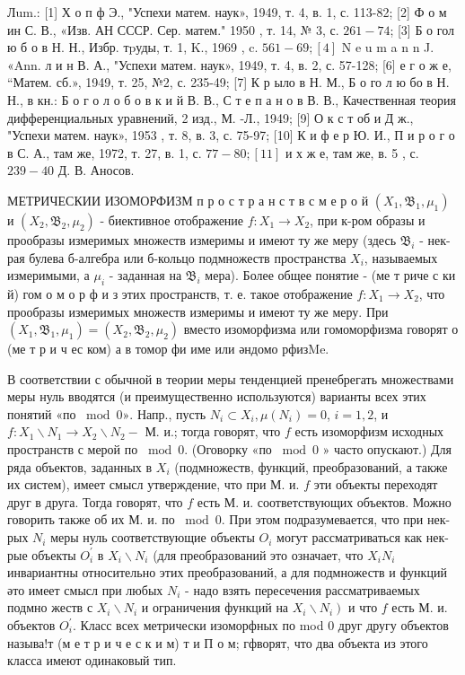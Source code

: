 \documentclass[10pt]{article}
\begin{document}
Лum.: [1] Х о п ф Э., "Успехи матем. наук», 1949, т. 4, в. 1, с. 113-82; [2] Ф о м ин С. В., «Изв. АН СССР. Сер. матем." 1950 , т. 14, № 3, с. $261-74$; [3] Б о гол ю б о в Н. Н., Избр. тpуды, т. 1, K., 1969 , c. $561-69 ;[4]$ N e u m a n n J. «Ann. л и н В. А., "Успехи матем. наук», 1949, т. 4, в. 2, с. 57-128; [6] е г о ж е, “Матем. сб.», 1949, т. 25, №2, с. 235-49; [7] К р ыло в Н. М., Б о го л ю бо в Н. Н., в кн.: Б о г о л о б о в к и й В. В., С т е п а н о в В. В., Качественная теория дифференциальных уравнений, 2 изд., М. -Л., 1949; [9] О к с т об и Д ж., "Успехи матем. наук», 1953 , т. 8, в. 3, с. 75-97; [10] К и ф е р Ю. И., П и р о г о в С. А., там же, 1972, т. 27, в. 1, с. $77-80 ;[11]$ и х ж е, там же, в. 5 , с. $239-40$ Д. В. Аносов.



МЕТРИЧЕСКИИ ИЗОМОРФИЗМ п р о с т р а н с т в с м е р о й $\left(X_{1}, \mathfrak{B}_{1}, \mu_{1}\right)$ и $\left(X_{2}, \mathfrak{B}_{2}, \mu_{2}\right)$ - биективное отображение $f: X_{1} \rightarrow X_{2}$, при к-ром образы и прообразы измеримых множеств измеримы и имеют ту же меру (здесь $\mathfrak{B}_{i}$ - нек-рая булева б-алгебра или б-кольцо подмножеств пространства $X_{i}$, называемых измеримыми, а $\mu_{i}$ - заданная на $\mathfrak{B}_{i}$ мера). Более общее понятие - (ме т риче с ки й) гом о м о р ф и з этих пространств, т. е. такое отображение $f: X_{1} \rightarrow X_{2}$, что прообразы измеримых множеств измеримы и имеют ту же меру. При $\left(X_{1}, \mathfrak{B}_{1}, \mu_{1}\right)=\left(X_{2}, \mathfrak{B}_{2}, \mu_{2}\right)$ вместо изоморфизма или гомоморфизма говорят о (ме т р и ч ес ком) а в томор фи име или әндомо рфизMe.



В соответствии с обычной в теории меры тенденцией пренебрегать множествами меры нуль вводятся (и преимущественно используются) варианты всех этих понятий «по $\bmod 0 »$. Напр., пусть $N_{i} \subset X_{i}, \mu\left(N_{i}\right)=0$, $i=1,2$, и $f: X_{1} \backslash N_{1} \rightarrow X_{2} \backslash N_{2}-$ М. и.; тогда говорят, что $f$ есть изоморфизм исходных пространств с мерой по $\bmod 0$. (Оговорку «по $\bmod 0$ » часто опускают.) Для ряда объектов, заданных в $X_{i}$ (подмножеств, функций, преобразований, а также их систем), имеет смысл утверждение, что при М. и. $f$ эти объекты переходят друг в друга. Тогда говорят, что $f$ есть М. и. соответствующих объектов. Можно говорить также об их М. и. по $\bmod 0$. При этом подразумевается, что при нек-рых $N_{i}$ меры нуль соответствующие объекты $O_{i}$ могут рассматриваться как нек-рые объекты $O_{i}^{\prime}$ в $X_{i} \backslash N_{i}$ (для преобразований это означает, что $X_{i} N_{i}$ инвариантны относительно этих преобразований, а для подмножеств и функций әто имеет смысл при любых $N_{i}$ - надо взять пересечения рассматриваемых подмно жеств с $X_{i} \backslash N_{i}$ и ограничения функций на $\left.X_{i} \backslash N_{i}\right)$ и что $f$ есть М. и. объектов $O_{i}^{\prime}$. Класс всех метрически изоморфных по mod 0 друг другу объектов называ!т (м е т р и ч е с к и м) т и П о м; гфворят, что два объекта из этого класса имеют одинаковый тип.
\end{document}
